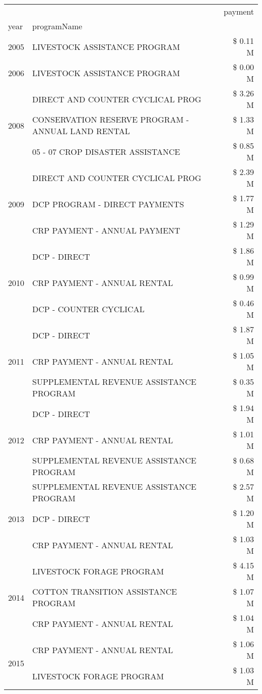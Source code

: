 \begin{tabular}{llr}
\toprule
 &  & payment \\
year & programName &  \\
\midrule
2005 & LIVESTOCK ASSISTANCE PROGRAM & \$ 0.11 M \\
\cline{1-3}
2006 & LIVESTOCK ASSISTANCE PROGRAM & \$ 0.00 M \\
\cline{1-3}
\multirow[t]{3}{*}{2008} & DIRECT AND COUNTER CYCLICAL PROG & \$ 3.26 M \\
 & CONSERVATION RESERVE PROGRAM - ANNUAL LAND RENTAL & \$ 1.33 M \\
 & 05 - 07 CROP DISASTER ASSISTANCE & \$ 0.85 M \\
\cline{1-3}
\multirow[t]{3}{*}{2009} & DIRECT AND COUNTER CYCLICAL PROG & \$ 2.39 M \\
 & DCP PROGRAM - DIRECT PAYMENTS & \$ 1.77 M \\
 & CRP PAYMENT - ANNUAL PAYMENT & \$ 1.29 M \\
\cline{1-3}
\multirow[t]{3}{*}{2010} & DCP - DIRECT & \$ 1.86 M \\
 & CRP PAYMENT - ANNUAL RENTAL & \$ 0.99 M \\
 & DCP - COUNTER CYCLICAL & \$ 0.46 M \\
\cline{1-3}
\multirow[t]{3}{*}{2011} & DCP - DIRECT & \$ 1.87 M \\
 & CRP PAYMENT - ANNUAL RENTAL & \$ 1.05 M \\
 & SUPPLEMENTAL REVENUE ASSISTANCE PROGRAM & \$ 0.35 M \\
\cline{1-3}
\multirow[t]{3}{*}{2012} & DCP - DIRECT & \$ 1.94 M \\
 & CRP PAYMENT - ANNUAL RENTAL & \$ 1.01 M \\
 & SUPPLEMENTAL REVENUE ASSISTANCE PROGRAM & \$ 0.68 M \\
\cline{1-3}
\multirow[t]{3}{*}{2013} & SUPPLEMENTAL REVENUE ASSISTANCE PROGRAM & \$ 2.57 M \\
 & DCP - DIRECT & \$ 1.20 M \\
 & CRP PAYMENT - ANNUAL RENTAL & \$ 1.03 M \\
\cline{1-3}
\multirow[t]{3}{*}{2014} & LIVESTOCK FORAGE PROGRAM & \$ 4.15 M \\
 & COTTON TRANSITION ASSISTANCE PROGRAM & \$ 1.07 M \\
 & CRP PAYMENT - ANNUAL RENTAL & \$ 1.04 M \\
\cline{1-3}
\multirow[t]{3}{*}{2015} & CRP PAYMENT - ANNUAL RENTAL & \$ 1.06 M \\
 & LIVESTOCK FORAGE PROGRAM & \$ 1.03 M \\

\end{tabular}
